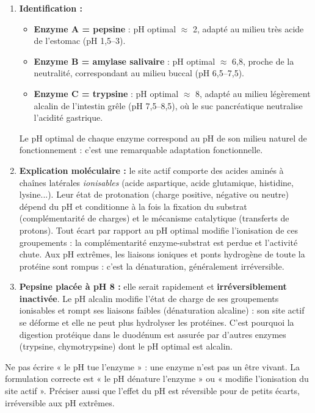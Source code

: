 \documentclass[11pt]{article}
\newcommand{\cle}[1]{{\popxbold\color{popdark}#1}}
\begin{document}
\begin{corrige}
\begin{enumerate}
    \item \textbf{Identification :}
    \begin{itemize}
        \item \textbf{Enzyme A = pepsine} : pH optimal $\approx$ 2, adapté au milieu très acide de l'estomac (pH 1,5--3).
        \item \textbf{Enzyme B = amylase salivaire} : pH optimal $\approx$ 6,8, proche de la neutralité, correspondant au milieu buccal (pH 6,5--7,5).
        \item \textbf{Enzyme C = trypsine} : pH optimal $\approx$ 8, adapté au milieu légèrement alcalin de l'intestin grêle (pH 7,5--8,5), où le suc pancréatique neutralise l'acidité gastrique.
    \end{itemize}
    Le pH optimal de chaque enzyme correspond au pH de son milieu naturel de fonctionnement : c'est une remarquable adaptation fonctionnelle.
    \item \textbf{Explication moléculaire :} le site actif comporte des acides aminés à chaînes latérales \emph{ionisables} (acide aspartique, acide glutamique, histidine, lysine...). Leur état de protonation (charge positive, négative ou neutre) dépend du pH et conditionne à la fois la fixation du substrat (complémentarité de charges) et le mécanisme catalytique (transferts de protons). Tout écart par rapport au pH optimal modifie l'ionisation de ces groupements : la complémentarité enzyme-substrat est perdue et l'activité chute. Aux pH extrêmes, les liaisons ioniques et ponts hydrogène de toute la protéine sont rompus : c'est la \cle{dénaturation}, généralement irréversible.
    \item \textbf{Pepsine placée à pH 8 :} elle serait rapidement et \textbf{irréversiblement inactivée}. Le pH alcalin modifie l'état de charge de ses groupements ionisables et rompt ses liaisons faibles (dénaturation alcaline) : son site actif se déforme et elle ne peut plus hydrolyser les protéines. C'est pourquoi la digestion protéique dans le duodénum est assurée par d'autres enzymes (trypsine, chymotrypsine) dont le pH optimal est alcalin.
\end{enumerate}
\end{corrige}

\begin{attention}
Ne pas écrire « le pH tue l'enzyme » : une enzyme n'est pas un être vivant. La formulation correcte est « le pH dénature l'enzyme » ou « modifie l'ionisation du site actif ». Préciser aussi que l'effet du pH est réversible pour de petits écarts, irréversible aux pH extrêmes.
\end{attention}
\end{document}
